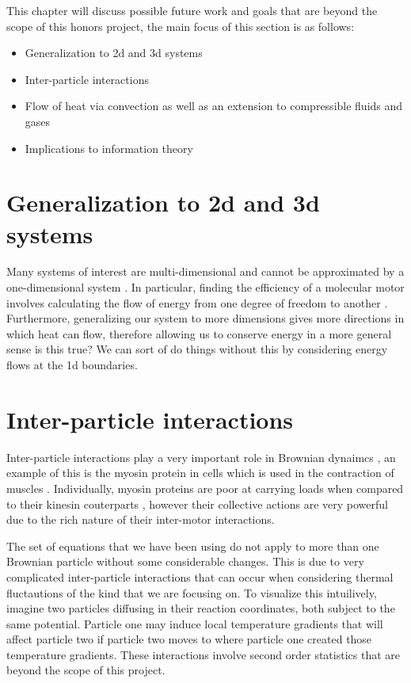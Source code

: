 This chapter will discuss possible future work and goals that are beyond the scope of this honors project, the main focus of this section is as follows:

\begin{itemize}
    \item{Generalization to 2d and 3d systems}
    \item{Inter-particle interactions}
    \item{Flow of heat via convection as well as an extension to compressible fluids and gases}
    \item{Implications to information theory}
\end{itemize}

\section{Generalization to 2d and 3d systems}
Many systems of interest are multi-dimensional and cannot be approximated by a one-dimensional system \cite{KellerBustamante2000,Magnasco1994,Reimann2001,ChallisJack2014,M.W.Jack2016}. In particular, finding the efficiency of a molecular motor involves calculating the flow of energy from one degree of freedom to another \cite{M.W.Jack2016}. Furthermore, generalizing our system to more dimensions gives more directions in which heat can flow, therefore allowing us to conserve energy in a more general sense {\color{red} is this true? We can sort of do things without this by considering energy flows at the 1d boundaries.}

\section{Inter-particle interactions}
Inter-particle interactions play a very important role in Brownian dynaimcs \cite{leibler1990physical,Leibler1993}, an example of this is the myosin protein in cells which is used in the contraction of muscles \cite{TyskaWarshaw2002}. Individually, myosin proteins are poor at carrying loads when compared to their kinesin couterparts \cite{TyskaWarshaw2002}, however their collective actions are very powerful due to the rich nature of their inter-motor interactions.

The set of equations that we have been using do not apply to more than one Brownian particle without some considerable changes. This is due to very complicated inter-particle interactions that can occur when considering thermal fluctautions of the kind that we are focusing on. To visualize this intuilively, imagine two particles diffusing in their reaction coordinates, both subject to the same potential. Particle one may induce local temperature gradients that will affect particle two if particle two moves to where particle one created those temperature gradients. These interactions involve second order statistics that are beyond the scope of this project.

